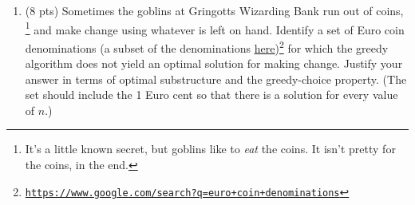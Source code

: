 \documentclass[12pt]{article}
\begin{document}
\begin{enumerate}
\begin{enumerate}
	\item \label{3b} (8 pts) Sometimes the goblins at Gringotts Wizarding Bank run out of coins,%
	\footnote{It's a little known secret, but goblins like to \textit{eat} the coins. It isn't pretty for the coins, in the end.}
	and make change using whatever is left on hand. Identify a set of Euro coin denominations (a subset of the denominations {\color{blue} \href{https://www.google.com/search?q=euro+coin+denominations}{\underline{here}}})\footnote{\href{https://www.google.com/search?q=euro+coin+denominations}{\tt https://www.google.com/search?q=euro+coin+denominations}} for which the greedy algorithm does not yield an optimal solution for making change. Justify your answer in terms of optimal substructure and the greedy-choice property. (The set should include the 1 Euro cent so that there is a solution for every value of $n$.)
	
	
	
	\end{enumerate}

	
	

\end{enumerate}
\end{document}
